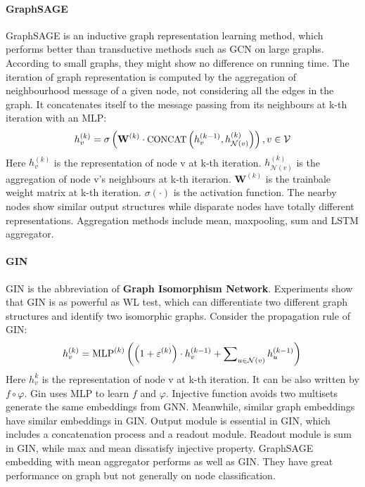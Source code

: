 \documentclass[sigconf]{acmart}
\begin{document}
\paragraph{GraphSAGE}  GraphSAGE is an inductive graph representation learning method\cite{hamilton2017inductive}, which performs better than transductive methods such as GCN on large graphs. According to small graphs, they might show no difference on running time. The iteration of graph representation is computed by the aggregation of neighbourhood message of a given node, not considering all the edges in the graph. It concatenates itself to the message passing from its neighbours at k-th iteration with an MLP:
\begin{equation}
\setlength\abovedisplayskip{5pt}%
\setlength\belowdisplayskip{5pt}
h_{v}^{(k)} = \sigma\left(\mathbf{W}^{(k)} \cdot \textup{\small CONCAT} \left(h_{v}^{(k-1)},h_{\mathcal N\left(v\right)}^{(k)}\right)\right), v \in \mathcal V\\ 
\end{equation}
Here $h_{v}^{(k)}$ is the representation of node v at k-th iteration. $h_{\mathcal N\left(v\right)}^{(k)}$ is the aggregation of node v's neighbours at k-th iterarion. $\mathbf{W}^{(k)}$ is the trainbale weight matrix at k-th iteration. $\sigma\left( \cdot \right)$ is the activation function. The nearby nodes show similar output structures while disparate nodes have totally different representations\cite{hamilton2017inductive}. Aggregation methods include mean, maxpooling, sum and LSTM aggregator\cite{hamilton2017inductive}.

\paragraph{GIN}  GIN is the abbreviation of \textbf{Graph Isomorphism Network}\cite{xu2018powerful}. Experiments show that GIN is as powerful as WL test, which can differentiate two different graph structures and identify two isomorphic graphs. Consider the propagation rule of GIN:
\begin{equation}
\setlength\abovedisplayskip{5pt}%
\setlength\belowdisplayskip{5pt}
h_{v}^{(k)} = \textup{MLP}^{(k)}\left( \left( 1 + \varepsilon^{(k)}\right) \cdot h_{v}^{(k-1)} + \sum\nolimits_{u \in \mathcal N(v)} h_{u}^{(k-1)}\right)  \\
\end{equation}
Here $h_{v}^{k}$ is the representation of node v at k-th iteration. It can be also written by $f\circ\varphi$. {\sc Gin} uses MLP to learn $f$ and $\varphi$. Injective function avoids two multisets generate the same embeddings from GNN. Meanwhile, similar graph embeddings have similar embeddings in GIN. Output module is essential in GIN, which includes a concatenation process and a readout module. Readout module is sum in GIN, while max and mean dissatisfy injective property. GraphSAGE embedding with mean aggregator performs as well as GIN. They have great performance on graph but not generally on node classification.
\end{document}
